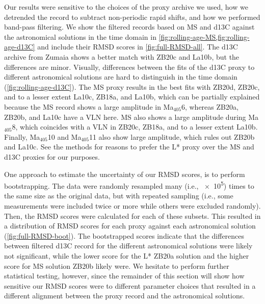 \documentclass[draft]{agujournal2019}
\newcommand{\ma}[1]{Ma\(_{405}\)#1} %
\begin{document}
Our results were sensitive to the choices of the proxy archive we used, how we detrended the record to subtract non-periodic rapid shifts, and how we performed band-pass filtering.
We show the filtered records based on \gls{MS} and \gls{d13C} against the astronomical solutions in the time domain in \cref{fig:rolling-age-MS,fig:rolling-age-d13C} and include their \gls{RMSD} scores in \cref{fig:full-RMSD-all}.
The \gls{d13C} archive from Zumaia shows a better match with ZB20c and La10b, but the differences are minor.
Visually, differences between the fits of the \gls{d13C} proxy to different astronomical solutions are hard to distinguish in the time domain (\cref{fig:rolling-age-d13C}).
The \gls{MS} proxy results in the best fits with ZB20d, ZB20c, and to a lesser extent La10c, ZB18a, and La10b, which can be partially explained because the \gls{MS} record shows a large amplitude in \ma{6}, whereas ZB20a, ZB20b, and La10c have a \gls{VLN} here.
\gls{MS} also shows a large amplitude during \ma{8}, which coincides with a \gls{VLN} in ZB20c, ZB18a, and to a lesser extent La10b.
Finally, \ma{10} and \ma{11} also show large amplitude, which rules out ZB20b and La10c.
See the methods for reasons to prefer the \gls{L*} proxy over the \gls{MS} and \gls{d13C} proxies for our purposes.

One approach to estimate the uncertainty of our \gls{RMSD} scores, is to perform bootstrapping.
The data were randomly resampled many (i.e., \num{e5}) times to the same size as the original data, but with repeated sampling (i.e., some measurements were included twice or more while others were excluded randomly).
Then, the \gls{RMSD} scores were calculated for each of these subsets.
This resulted in a distribution of \gls{RMSD} scores for each proxy against each astronomical solution (\cref{fig:full-RMSD-boot}).
The bootstrapped scores indicate that the differences between filtered \gls{d13C} record for the different astronomical solutions were likely not significant,
while the lower score for the \gls{L*} ZB20a solution
and the higher score for \gls{MS} solution ZB20b
likely were.
We hesitate to perform further statistical testing, however, since the remainder of this section will show how sensitive our \gls{RMSD} scores were to different parameter choices that resulted in a different alignment between the proxy record and the astronomical solutions.
\end{document}
